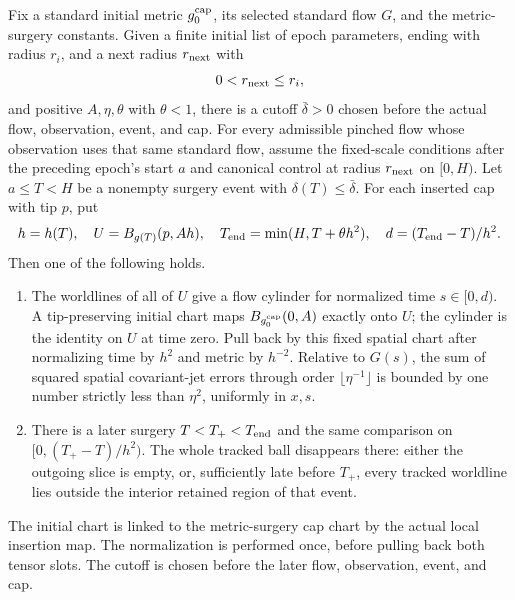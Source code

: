 \begin{theorem}
\label{thm:cap-persistence}
Fix a standard initial metric $g_0^{\rm cap}$, its selected standard
flow $G$, and the metric-surgery
constants.  Given a finite initial list of epoch parameters, ending with
radius $r_i$, and a next radius $r_{\rm next}$
with
\[
 0<r_{\rm next}\leq r_i,
\]
and positive $A,\eta,\theta$ with $\theta<1$, there is a cutoff
$\bar\delta>0$ chosen before the actual flow, observation, event, and cap.
For every admissible pinched flow whose observation uses that same
standard flow, assume the fixed-scale conditions after the preceding
epoch's start $a$ and canonical control at radius $r_{\rm next}$
on $[0,H)$.  Let $a\leq T<H$ be a nonempty surgery event with
$\delta(T)\leq\bar\delta$.  For each inserted cap with tip $p$, put
\[
 h=h(T),\quad U=B_{g(T)}(p,Ah),\quad
 T_{\rm end}=\min(H,T+\theta h^2),\quad
 d=(T_{\rm end}-T)/h^2.
\]
Then one of the following holds.

\begin{enumerate}
\item The worldlines of all of $U$ give a flow cylinder for normalized
  time $s\in[0,d)$.  A tip-preserving initial chart maps
  $B_{g_0^{\rm cap}}(0,A)$ exactly onto $U$; the cylinder is the
  identity on $U$ at time zero.  Pull back by this fixed spatial
  chart after normalizing time by $h^2$ and metric by $h^{-2}$.
  Relative to $G(s)$, the sum of squared spatial covariant-jet
  errors through order $\lfloor\eta^{-1}\rfloor$ is bounded by
  one number strictly less than $\eta^2$, uniformly in $x,s$.
\item There is a later surgery $T<T_+<T_{\rm end}$ and the same
  comparison on $[0,(T_+-T)/h^2)$.  The whole tracked ball disappears
  there: either the outgoing slice is empty, or, sufficiently late
  before $T_+$, every tracked worldline lies outside the interior
  retained region of that event.
\end{enumerate}

The initial chart is linked to the metric-surgery cap chart by the actual
local insertion map.  The normalization is performed once, before
pulling back both tensor slots.  The cutoff is chosen before the later
flow, observation, event, and cap.
\cite[Proposition 16.5, pp. 370--371; Claim 16.6 and Corollary 16.9,
pp. 371--373; Claim 16.10, pp. 374--375]{MT2007}
\end{theorem}

